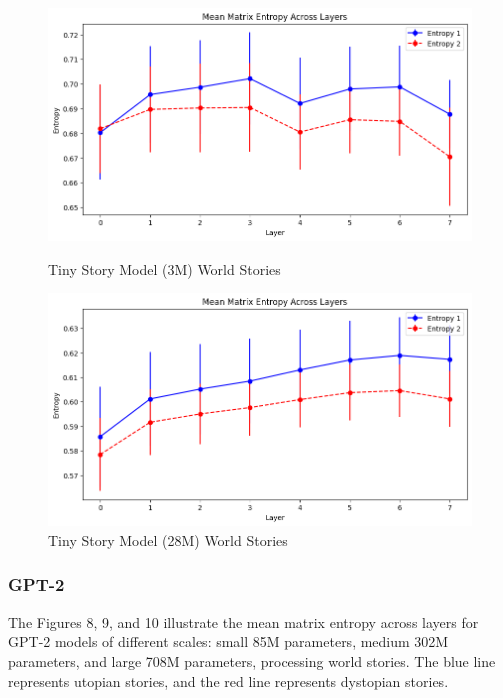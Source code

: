 \documentclass{article}
\begin{document}
\begin{figure}[H]
    \centering
    \begin{minipage}{0.5\linewidth}
        \includegraphics[width=\linewidth]{Tiny_Word_Stories.png}
        \caption{Tiny Story Model (3M) World Stories}
        \label{fig:Tiny_world}
    \end{minipage}\hfill
    \begin{minipage}{0.5\linewidth}
        \includegraphics[width=\linewidth]{Tiny_l_World_Stories.png}
        \caption{Tiny Story Model (28M) World Stories}
        \label{fig:Tiny_l_world}
    \end{minipage}\hfill
\end{figure}




\subsubsection{GPT-2}

The Figures 8, 9, and 10 illustrate the mean matrix entropy across layers for GPT-2 models of different scales: small 85M parameters, medium 302M parameters, and large 708M parameters, processing world stories. The blue line represents utopian stories, and the red line represents dystopian stories.
\end{document}
